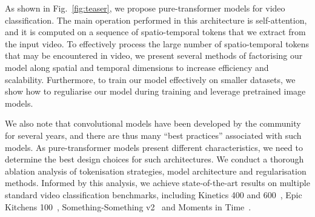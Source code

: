 



As shown in Fig.~\ref{fig:teaser}, we propose pure-transformer models for video classification.
The main operation performed in this architecture is self-attention, and it is computed on a sequence of spatio-temporal tokens that we extract from the input video.
To effectively process the large number of spatio-temporal tokens that may be encountered in video, we present several methods of factorising our model along spatial and temporal dimensions to increase efficiency and scalability.
Furthermore, to train our model effectively on smaller datasets, we show how to reguliarise our model during training and leverage pretrained image models.





We also note that convolutional models have been developed by the community for several years, and there are thus many ``best practices'' associated with such models.
As pure-transformer models present different characteristics, we need to determine the best design choices for such architectures. 
We conduct a thorough ablation analysis of tokenisation strategies, model architecture and regularisation methods.
Informed by this analysis, we achieve state-of-the-art results on multiple standard video classification benchmarks, including Kinetics 400 and 600~\cite{kay_arxiv_2017}, Epic Kitchens 100~\cite{damen_arxiv_2020}, Something-Something v2~\cite{goyal_iccv_2017} and Moments in Time~\cite{monfort_pami_2019}.



